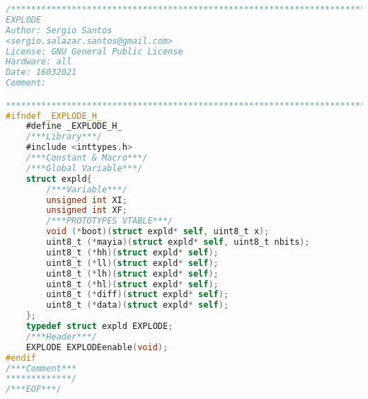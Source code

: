\begin{lstlisting}[language=C]
/************************************************************************
EXPLODE
Author: Sergio Santos
<sergio.salazar.santos@gmail.com>
License: GNU General Public License
Hardware: all
Date: 16032021
Comment:

************************************************************************/
#ifndef _EXPLODE_H_
	#define _EXPLODE_H_
	/***Library***/
	#include <inttypes.h>
	/***Constant & Macro***/
	/***Global Variable***/
	struct expld{
		/***Variable***/
		unsigned int XI;
		unsigned int XF;
		/***PROTOTYPES VTABLE***/
		void (*boot)(struct expld* self, uint8_t x);
		uint8_t (*mayia)(struct expld* self, uint8_t nbits);
		uint8_t (*hh)(struct expld* self);
		uint8_t (*ll)(struct expld* self);
		uint8_t (*lh)(struct expld* self);
		uint8_t (*hl)(struct expld* self);
		uint8_t (*diff)(struct expld* self);
		uint8_t (*data)(struct expld* self);
	};
	typedef struct expld EXPLODE;
	/***Header***/
	EXPLODE EXPLODEenable(void);
#endif
/***Comment***
*************/
/***EOF***/
\end{lstlisting}
